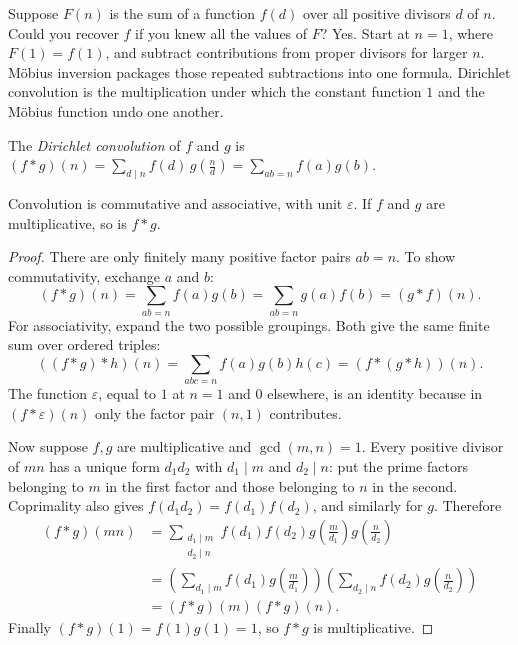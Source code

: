 Suppose $F(n)$ is the sum of a function $f(d)$ over all positive divisors $d$ of $n$. Could you recover $f$ if you knew all the values of $F$? Yes. Start at $n=1$, where $F(1)=f(1)$, and subtract contributions from proper divisors for larger $n$. Möbius inversion packages those repeated subtractions into one formula. Dirichlet convolution is the multiplication under which the constant function $1$ and the Möbius function undo one another.

\begin{definition}
The \emph{Dirichlet convolution} of $f$ and $g$ is $(f*g)(n)=\displaystyle\sum_{d\mid n}f(d)\,g\!\left(\frac nd\right)=\sum_{ab=n}f(a)g(b)$.
\end{definition}

\begin{proposition}\label{prop:conv}
Convolution is commutative and associative, with unit $\varepsilon$. If $f$ and $g$ are multiplicative, so is $f*g$.
\end{proposition}
\begin{proof}
There are only finitely many positive factor pairs $ab=n$.
To show commutativity, exchange $a$ and $b$:
\[
(f*g)(n)=\sum_{ab=n}f(a)g(b)
        =\sum_{ab=n}g(a)f(b)=(g*f)(n).
\]
For associativity, expand the two possible groupings.
Both give the same finite sum over ordered triples:
\[
((f*g)*h)(n)=\sum_{abc=n}f(a)g(b)h(c)
            =(f*(g*h))(n).
\]
The function $\varepsilon$, equal to $1$ at $n=1$
and $0$ elsewhere, is an identity because in
$(f*\varepsilon)(n)$ only the factor pair $(n,1)$
contributes.

Now suppose $f,g$ are multiplicative and
$\gcd(m,n)=1$. Every positive divisor of $mn$
has a unique form $d_1d_2$ with $d_1\mid m$ and
$d_2\mid n$: put the prime factors belonging to
$m$ in the first factor and those belonging to
$n$ in the second. Coprimality also gives
$f(d_1d_2)=f(d_1)f(d_2)$, and similarly for $g$.
Therefore
\[
\begin{aligned}
(f*g)(mn)
 &=\sum_{\substack{d_1\mid m\\d_2\mid n}}
   f(d_1)f(d_2)
   g\left(\frac{m}{d_1}\right)
   g\left(\frac{n}{d_2}\right)\\
 &=\left(\sum_{d_1\mid m}
     f(d_1)g\left(\frac{m}{d_1}\right)\right)
   \left(\sum_{d_2\mid n}
     f(d_2)g\left(\frac{n}{d_2}\right)\right)\\
 &=(f*g)(m)(f*g)(n).
\end{aligned}
\]
Finally $(f*g)(1)=f(1)g(1)=1$, so
$f*g$ is multiplicative.
\end{proof}

